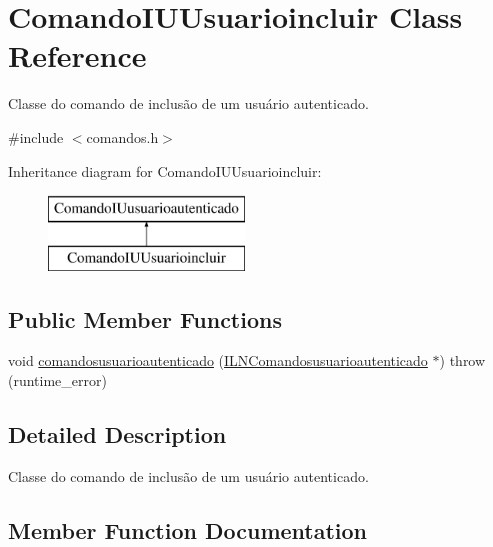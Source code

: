 \hypertarget{classComandoIUUsuarioincluir}{}\section{Comando\+I\+U\+Usuarioincluir Class Reference}
\label{classComandoIUUsuarioincluir}


Classe do comando de inclusão de um usuário autenticado.  




{\ttfamily \#include $<$comandos.\+h$>$}

Inheritance diagram for Comando\+I\+U\+Usuarioincluir\+:\begin{figure}[H]
\begin{center}
\leavevmode
\includegraphics[height=2.000000cm]{classComandoIUUsuarioincluir}
\end{center}
\end{figure}
\subsection*{Public Member Functions}
\begin{DoxyCompactItemize}
\item 
void \hyperlink{classComandoIUUsuarioincluir_a10d61b3ff5e7a675699132662cb82887}{comandosusuarioautenticado} (\hyperlink{classILNComandosusuarioautenticado}{I\+L\+N\+Comandosusuarioautenticado} $\ast$)  throw (runtime\+\_\+error)
\end{DoxyCompactItemize}


\subsection{Detailed Description}
Classe do comando de inclusão de um usuário autenticado. 

\subsection{Member Function Documentation}
\mbox{\label{classComandoIUUsuarioincluir_a10d61b3ff5e7a675699132662cb82887}} 
